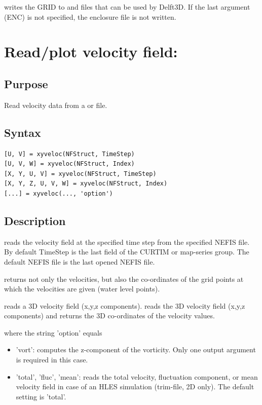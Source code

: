  writes the GRID to  and  files that can be used by Delft3D.
If the last argument (ENC) is not specified, the enclosure file is not written.

\section{Read/plot velocity field: }

\subsection*{Purpose}
Read velocity data from a  or  file.

\subsection*{Syntax}
\begin{Verbatim}
[U, V] = xyveloc(NFStruct, TimeStep)
[U, V, W] = xyveloc(NFStruct, Index)
[X, Y, U, V] = xyveloc(NFStruct, TimeStep)
[X, Y, Z, U, V, W] = xyveloc(NFStruct, Index)
[...] = xyveloc(..., 'option')
\end{Verbatim}

\subsection*{Description}
 reads the velocity field at the specified time step from the specified NEFIS file.
By default TimeStep is the last field of the CURTIM or map-series group.
The default NEFIS file is the last opened NEFIS file.

 returns not only the velocities, but also the co-ordinates of the grid points at which the velocities are given (water level points).

 reads a 3D velocity field (x,y,z components).
 reads the 3D velocity field (x,y,z components) and returns the 3D co-ordinates of the velocity values.

 where the string 'option' equals

\begin{itemize}
\item 'vort': computes the z-component of the vorticity.
Only one output argument is required in this case.
\item 'total', 'fluc', 'mean': reads the total velocity, fluctuation component, or mean velocity field in case of an HLES simulation (trim-file, 2D only).
The default setting is 'total'.
\end{itemize}


